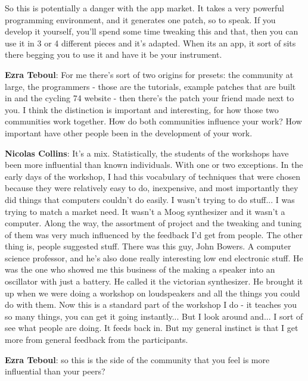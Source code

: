So this is potentially a danger with the app market. It takes a very powerful programming environment, and it generates one patch, so to speak. If you develop it yourself, you’ll spend some time tweaking this and that, then you can use it in 3 or 4 different pieces and it’s adapted. When its an app, it sort of sits there begging you to use it and have it be your instrument.
					
\textbf{Ezra Teboul}: For me there’s sort of two origins for presets: the community at large, the programmers - those are the tutorials, example patches that are built in and the cycling 74 website - then there’s the patch your friend made next to you. I think the distinction is important and interesting, for how those two communities work together. How do both communities influence your work? How important have other people been in the development of your work.
					
\textbf{Nicolas Collins}: It’s a mix. Statistically, the students of the workshops have been more influential than known individuals. With one or two exceptions. In the early days of the workshop, I had this vocabulary of techniques that were chosen because they were relatively easy to do, inexpensive, and most importantly they did things that computers couldn’t do easily. I wasn’t trying to do stuff... I was trying to match a market need. It wasn’t a Moog synthesizer and it wasn’t a computer. Along the way, the assortment of project and the tweaking and tuning of them was very much influenced by the feedback I’d get from people. The other thing is, people suggested stuff. There was this guy, John Bowers. A computer science professor, and he’s also done really interesting low end electronic stuff. He was the one who showed me this business of the making a speaker into an oscillator with just a battery. He called it the victorian synthesizer. He brought it up when we were doing a workshop on loudspeakers and all the things you could do with them. Now this is a standard part of the workshop I do - it teaches you so many things, you can get it going instantly... But I look around and... I sort of see what people are doing. It feeds back in. But my general instinct is that I get more from general feedback from the participants.
					
\textbf{Ezra Teboul}: so this is the side of the community that you feel is more influential than your peers?
					
